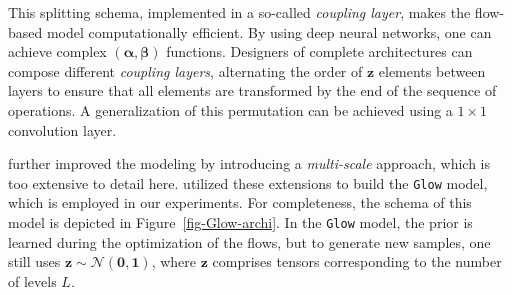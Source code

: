 \documentclass[fleqn,usenatbib]{mnras}
\begin{document}
This splitting schema, implemented in a so-called \textit{coupling layer}, makes the flow-based model computationally efficient. By using deep neural networks, one can achieve complex $(\bm{\alpha},\bm{\beta})$ functions. Designers of complete architectures can compose different \textit{coupling layers}, alternating the order of $\bm{z}$ elements between layers to ensure that all elements are transformed by the end of the sequence of operations. A generalization of this permutation can be achieved using a $1\times 1$ convolution layer.

\cite{DinhSB17} further improved the modeling by introducing a \textit{multi-scale} approach, which is too extensive to detail here. \cite{Kingma2018} utilized these extensions to build the \texttt{Glow} model, which is employed in our experiments. For completeness, the schema of this model is depicted in Figure~\ref{fig-Glow-archi}.
In the \texttt{Glow} model, the prior is learned during the optimization of the flows, but to generate new samples, one still uses $\bm{z} \sim \mathcal{N}(\bm{0}, \bm{1})$, where $\bm{z}$ comprises tensors corresponding to the number of levels $L$. 
\end{document}
